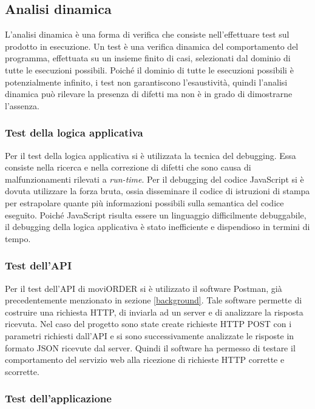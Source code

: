 \subsection{Analisi dinamica}

L'analisi dinamica è una forma di verifica che consiste nell'effettuare test sul prodotto in esecuzione. Un test è una verifica dinamica del comportamento del programma, effettuata su un insieme finito di casi, selezionati dal dominio di tutte le esecuzioni possibili. Poiché il dominio di tutte le esecuzioni possibili è potenzialmente infinito, i test non garantiscono l'esaustività, quindi l'analisi dinamica può rilevare la presenza di difetti ma non è in grado di dimostrarne l'assenza.

\subsubsection{Test della logica applicativa}

Per il test della logica applicativa si è utilizzata la tecnica del debugging. Essa consiste nella ricerca e nella correzione di difetti che sono causa di malfunzionamenti rilevati a \textit{run-time}. Per il debugging del codice JavaScript si è dovuta utilizzare la forza bruta, ossia disseminare il codice di istruzioni di stampa per estrapolare quante più informazioni possibili sulla semantica del codice eseguito. Poiché JavaScript risulta essere un linguaggio difficilmente debuggabile, il debugging della logica applicativa è stato inefficiente e dispendioso in termini di tempo.

\subsubsection{Test dell'API}

Per il test dell'API di moviORDER si è utilizzato il software Postman, già precedentemente menzionato in sezione \ref{background}. Tale software permette di costruire una richiesta HTTP, di inviarla ad un server e di analizzare la risposta ricevuta. Nel caso del progetto sono state create richieste HTTP POST con i parametri richiesti dall'API e si sono successivamente analizzate le risposte in formato JSON ricevute dal server.
Quindi il software ha permesso di testare il comportamento del servizio web alla ricezione di richieste HTTP corrette e scorrette.

\subsubsection{Test dell'applicazione}

